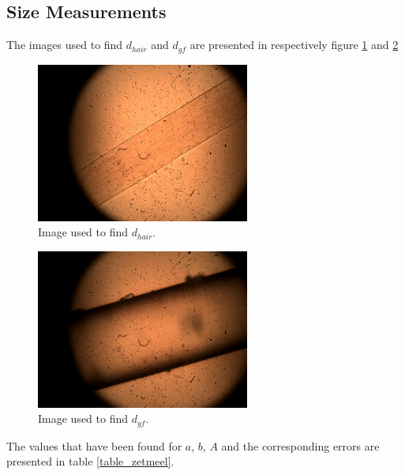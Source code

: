 \subsection{Size Measurements}
\label{appendix_size}

The images used to find $d_{hair}$ and $d_{gf}$ are presented in respectively figure \ref{fig_hair} and \ref{fig_gf}

\begin{figure}[h!]
    \centering
    \includegraphics[width=7cm]{afbeeldingen/size/hair.jpg}
    \captionsetup{font=small, justification = centering}
    \caption{Image used to find $d_{hair}$.}
    \label{fig_hair}
\end{figure}

\begin{figure}[h!]
    \centering
    \includegraphics[width=7cm]{afbeeldingen/size/gf.jpg}
    \captionsetup{font=small, justification = centering}
    \caption{Image used to find $d_{gf}$.}
    \label{fig_gf}
\end{figure}

\newpage

The values that have been found for $a$, $b$, $A$ and the corresponding errors are presented in table \ref{table_zetmeel}.

